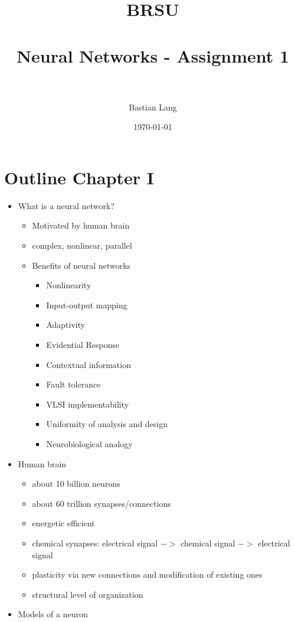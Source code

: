 \documentclass[paper=a4, fontsize=11pt]{scrartcl} %
\title{	
\normalfont \normalsize 
\textsc{BRSU} \\ [25pt] %
\horrule{0.5pt} \\[0.4cm] %
\huge Neural Networks - Assignment 1 \\ %
\horrule{2pt} \\[0.5cm] %
}
\author{Bastian Lang} %
\date{\normalsize\today} %
\numberwithin{equation}{section} %
\numberwithin{figure}{section} %
\numberwithin{table}{section} %
\begin{document}
\maketitle %

\section{Outline Chapter I}
\begin{itemize}
\item What is a neural network?

\begin{itemize}
\item Motivated by human brain
\item complex, nonlinear, parallel
\item Benefits of neural networks

\begin{itemize}
\item Nonlinearity
\item Input-output mapping
\item Adaptivity
\item Evidential Response
\item Contextual information
\item Fault tolerance
\item VLSI implementability
\item Uniformity of analysis and design
\item Neurobiological analogy
\end{itemize}

\end{itemize}

\item Human brain

\begin{itemize}
\item about 10 billion neurons
\item about 60 trillion synapses/connections
\item energetic efficient
\item chemical synapses: electrical signal $->$ chemical signal $->$ electrical signal
\item plasticity via new connections and modification of existing ones
\item structural level of organization

\end{itemize}

\item Models of a neuron


\end{itemize}
\end{document}
